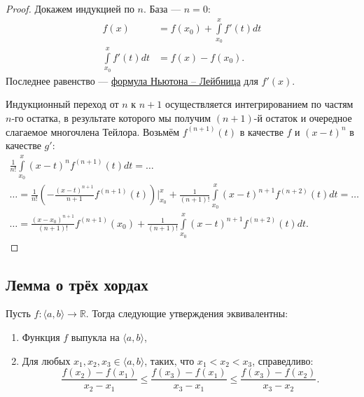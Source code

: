 \begin{proof}
	Докажем индукцией по \(n\). База ---  \(n = 0\):
	\begin{align*}
		f(x) &= f(x_0) + \int\limits_{x_0}^x f'(t) dt \\
		\int\limits_{x_0}^x f'(t) dt &= f(x) - f(x_0).
	\end{align*}
	Последнее равенство --- \hyperlink{t9}{формула Ньютона -- Лейбница} для \(f'(x)\).
	
	Индукционный переход от \(n\) к \(n + 1\) осуществляется интегрированием по частям \(n\)-го остатка, в результате которого мы получим \((n + 1)\)-й остаток и очередное слагаемое многочлена Тейлора. Возьмём \(f^{(n + 1)}(t)\) в качестве \(f\) и \((x - t)^n\)
	в качестве \(g'\):
	\begin{gather*}
		\frac{1}{n!} \int\limits_{x_0}^x (x - t)^n f^{(n + 1)}(t) dt = \ldots \\
		\ldots = \frac{1}{n!} \left(-\frac{(x - t)^{n + 1}}{n + 1} f^{(n + 1)}(t)\right) \bigg|_{x_0}^x + \frac{1}{(n + 1)!} \int\limits_{x_0}^x (x - t)^{n + 1} f^{(n + 2)}(t) dt = \ldots \\
		\ldots = \frac{(x - x_0)^{n + 1}}{(n + 1)!} f^{(n + 1)}(x_0)
		+ \frac{1}{(n + 1)!} \int\limits_{x_0}^x (x - t)^{n + 1} f^{(n + 2)}(t) dt.
	\end{gather*}
\end{proof}

\subsection{Лемма о трёх хордах}

\hypertarget{trihordy}{}
\begin{theorem}
	Пусть \(f \colon \langle a, b \rangle \to \mathbb{R}\). Тогда следующие утверждения эквивалентны:
	\begin{enumerate}
		\item Функция \(f\) выпукла на \(\langle a, b \rangle\),
		\item Для любых \(x_1, x_2, x_3 \in \langle a, b \rangle\), таких, что \(x_1 < x_2 < x_3\), справедливо: \[
		\frac{f(x_2) - f(x_1)}{x_2 - x_1} \leqslant \frac{f(x_3) - f(x_1)}{x_3 - x_1} \leqslant \frac{f(x_3) - f(x_2)}{x_3 - x_2}.
		\]
	\end{enumerate}
\end{theorem}

